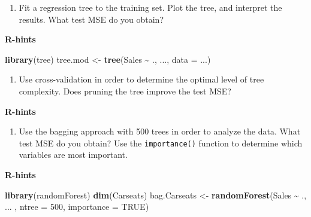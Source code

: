 \documentclass[
]{article}
\newenvironment{Shaded}{\begin{snugshade}}{\end{snugshade}}
\newcommand{\AttributeTok}[1]{\textcolor[rgb]{0.13,0.29,0.53}{#1}}
\newcommand{\ConstantTok}[1]{\textcolor[rgb]{0.56,0.35,0.01}{#1}}
\newcommand{\DecValTok}[1]{\textcolor[rgb]{0.00,0.00,0.81}{#1}}
\newcommand{\FunctionTok}[1]{\textcolor[rgb]{0.13,0.29,0.53}{\textbf{#1}}}
\newcommand{\NormalTok}[1]{#1}
\newcommand{\OtherTok}[1]{\textcolor[rgb]{0.56,0.35,0.01}{#1}}
\newcommand{\SpecialCharTok}[1]{\textcolor[rgb]{0.81,0.36,0.00}{\textbf{#1}}}
\providecommand{\tightlist}{%
  \setlength{\itemsep}{0pt}\setlength{\parskip}{0pt}}
\begin{document}
\begin{enumerate}
\def\labelenumi{\alph{enumi})}
\setcounter{enumi}{1}
\tightlist
\item
  Fit a regression tree to the training set. Plot the tree, and
  interpret the results. What test MSE do you obtain?
\end{enumerate}

\textbf{R-hints}

\begin{Shaded}
\begin{Highlighting}[]
\FunctionTok{library}\NormalTok{(tree)}
\NormalTok{tree.mod }\OtherTok{\textless{}{-}} \FunctionTok{tree}\NormalTok{(Sales }\SpecialCharTok{\textasciitilde{}}\NormalTok{ ., ..., }\AttributeTok{data =}\NormalTok{ ...)}
\end{Highlighting}
\end{Shaded}

\begin{enumerate}
\def\labelenumi{\alph{enumi})}
\setcounter{enumi}{2}
\tightlist
\item
  Use cross-validation in order to determine the optimal level of tree
  complexity. Does pruning the tree improve the test MSE?
\end{enumerate}

\textbf{R-hints}

\begin{Shaded}
\end{Shaded}

\begin{enumerate}
\def\labelenumi{\alph{enumi})}
\setcounter{enumi}{3}
\tightlist
\item
  Use the bagging approach with 500 trees in order to analyze the data.
  What test MSE do you obtain? Use the \texttt{importance()} function to
  determine which variables are most important.
\end{enumerate}

\textbf{R-hints}

\begin{Shaded}
\begin{Highlighting}[]
\FunctionTok{library}\NormalTok{(randomForest)}
\FunctionTok{dim}\NormalTok{(Carseats)}
\NormalTok{bag.Carseats }\OtherTok{\textless{}{-}} \FunctionTok{randomForest}\NormalTok{(Sales }\SpecialCharTok{\textasciitilde{}}\NormalTok{ ., ... , }\AttributeTok{ntree =} \DecValTok{500}\NormalTok{, }\AttributeTok{importance =} \ConstantTok{TRUE}\NormalTok{)}
\end{Highlighting}
\end{Shaded}
\end{document}
